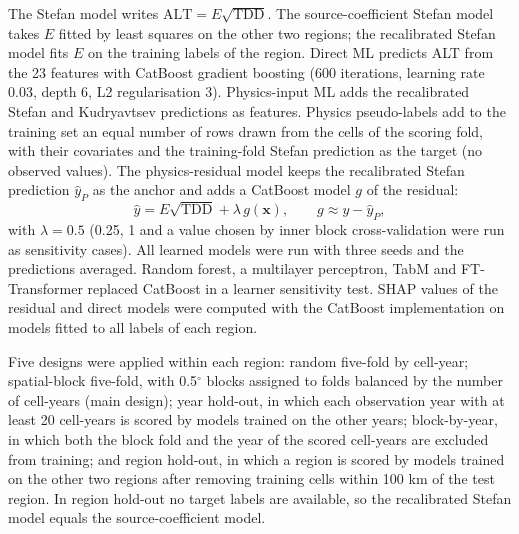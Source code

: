 The Stefan model writes $\mathrm{ALT}=E\sqrt{\mathrm{TDD}}$\cite{Stefan1891}. The source-coefficient Stefan model takes $E$ fitted by least squares on the other two regions; the recalibrated Stefan model fits $E$ on the training labels of the region. Direct ML predicts ALT from the 23 features with CatBoost gradient boosting\cite{Prokhorenkova2018} (600 iterations, learning rate 0.03, depth 6, L2 regularisation 3). Physics-input ML adds the recalibrated Stefan and Kudryavtsev\cite{Kudryavtsev1974} predictions as features. Physics pseudo-labels add to the training set an equal number of rows drawn from the cells of the scoring fold, with their covariates and the training-fold Stefan prediction as the target (no observed values). The physics-residual model keeps the recalibrated Stefan prediction $\hat{y}_P$ as the anchor and adds a CatBoost model $g$ of the residual:
\begin{equation}
\hat{y} = E\sqrt{\mathrm{TDD}} + \lambda\, g(\mathbf{x}), \qquad g \approx y - \hat{y}_P,
\end{equation}
with $\lambda = 0.5$ (0.25, 1 and a value chosen by inner block cross-validation were run as sensitivity cases). All learned models were run with three seeds and the predictions averaged. Random forest, a multilayer perceptron, TabM and FT-Transformer\cite{Gorishniy2021,Gorishniy2025,Holzmuller2024} replaced CatBoost in a learner sensitivity test. SHAP values of the residual and direct models were computed with the CatBoost implementation\cite{Lundberg2017} on models fitted to all labels of each region.

Five designs were applied within each region\cite{Roberts2017,Ploton2020}: random five-fold by cell-year; spatial-block five-fold, with 0.5$^\circ$ blocks assigned to folds balanced by the number of cell-years (main design); year hold-out, in which each observation year with at least 20 cell-years is scored by models trained on the other years; block-by-year, in which both the block fold and the year of the scored cell-years are excluded from training; and region hold-out, in which a region is scored by models trained on the other two regions after removing training cells within 100 km of the test region. In region hold-out no target labels are available, so the recalibrated Stefan model equals the source-coefficient model.

